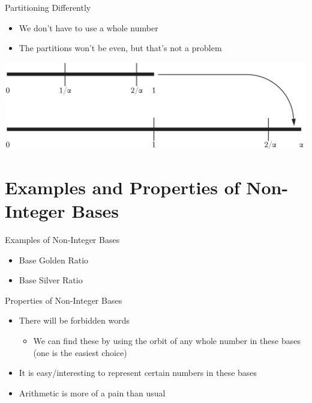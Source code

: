 \documentclass{beamer}
\begin{document}
            \begin{frame}{Partitioning Differently}
              \begin{itemize}
                \item We don't have to use a whole number
                \item The partitions won't be even, but that's not a problem
              \end{itemize}
              \includegraphics[width=\textwidth]{images/partitioning/partitioningalpha}
            \end{frame}





            \section{Examples and Properties of Non-Integer Bases}
            \begin{frame}{Examples of Non-Integer Bases}
              \begin{itemize}
                \item Base Golden Ratio
                \item Base Silver Ratio
              \end{itemize}
            \end{frame}

            \begin{frame}{Properties of Non-Integer Bases}
              \begin{itemize}
                \item There will be forbidden words
                \begin{itemize}
                  \item We can find these by using the orbit of any whole number in these bases (one is the easiest choice)
                \end{itemize}
                \item It is easy/interesting to represent certain numbers in these bases
                \item Arithmetic is more of a pain than usual
              \end{itemize}
            \end{frame}
\end{document}
